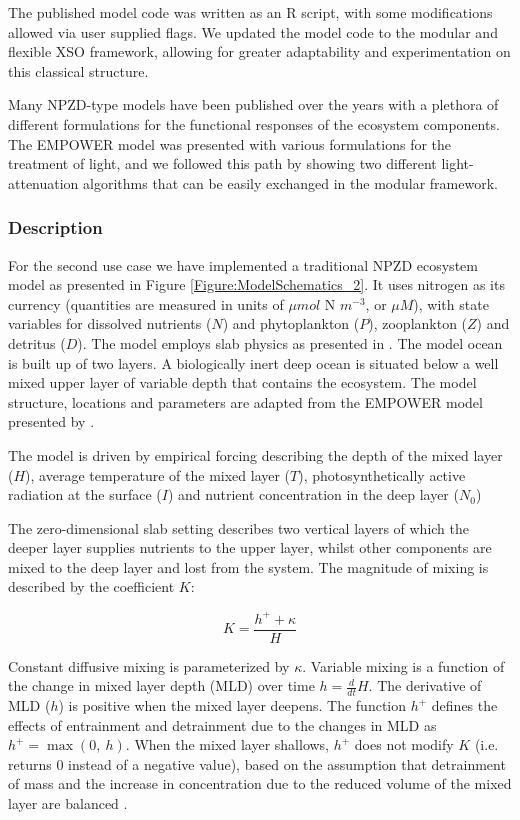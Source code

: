 \documentclass[journal abbreviation, manuscript]{copernicus}
\begin{document}
The published model code was written as an R script, with some modifications allowed via user supplied flags. We updated the model code to the modular and flexible XSO framework, allowing for greater adaptability and experimentation on this classical structure.

Many NPZD-type models have been published over the years with a plethora of different formulations for the functional responses of the ecosystem components. The EMPOWER model was presented with various formulations for the treatment of light, and we followed this path by showing two different light-attenuation algorithms that can be easily exchanged in the modular framework. 

\subsubsection{Description}
For the second use case we have implemented a traditional NPZD ecosystem model as presented in Figure \ref{Figure:ModelSchematics_2}. It uses nitrogen as its currency (quantities are measured in units of $\mu mol$ N $m^{-3}$, or $\mu M$), with state variables for dissolved nutrients ($N$) and phytoplankton ($P$), zooplankton ($Z$) and detritus ($D$). The model employs slab physics as presented in \citet{Evans1985ACycles}. The model ocean is built up of two layers. A biologically inert deep ocean is situated below a well mixed upper layer of variable depth that contains the ecosystem. The model structure, locations and parameters are adapted from the EMPOWER model presented by \citet{Anderson2015c}.

The model is driven by empirical forcing describing the depth of the mixed layer ($H$), average temperature of the mixed layer ($T$), photosynthetically active radiation at the surface ($I$) and nutrient concentration in the deep layer ($N_0$) 

The zero-dimensional slab setting describes two vertical layers of which the deeper layer supplies nutrients to the upper layer, whilst other components are mixed to the deep layer and lost from the system.
The magnitude of mixing is described by the coefficient $K$:

\begin{equation}
    K = \frac{h^{+} + \kappa}{H}
\end{equation}

Constant diffusive mixing is parameterized by $\kappa$. Variable mixing is a function of the change in mixed layer depth (MLD) over time $h = \frac{d}{d t} H$. The derivative of MLD ($h$) is positive when the mixed layer deepens. The function $h^{+}$ defines the effects of entrainment and detrainment due to the changes in MLD as $h^{+} = \max(0, \ h)$. When the mixed layer shallows, $h^{+}$ does not modify $K$ (i.e. returns 0 instead of a negative value), based on the assumption that detrainment of mass and the increase in concentration due to the reduced volume of the mixed layer are balanced \citep{Evans1985ACycles}. 
\end{document}
